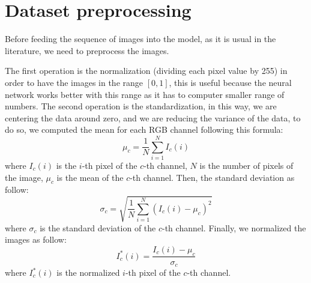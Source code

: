 \section{Dataset preprocessing}\label{sec:dataset-preprocessing}

Before feeding the sequence of images into the model, as it is usual in the literature, we need to preprocess the images.

The first operation is the normalization (dividing each pixel value by 255) in order to have the images in the range $[0,1]$, this is useful because the neural network works better with this range as it has to computer smaller range of numbers.
The second operation is the standardization, in this way, we are centering the data around zero, and we are reducing the variance of the data, to do so, we computed the mean for each RGB channel following this formula:
\begin{equation}
    \mu_{c} = \frac{1}{N}\sum_{i=1}^{N}I_{c}(i)
    \label{eq:equation_mean}
\end{equation}
where $I_{c}(i)$ is the $i$-th pixel of the $c$-th channel, $N$ is the number of pixels of the image, $\mu_{c}$ is the mean of the $c$-th channel.
Then, the standard deviation as follow:
\begin{equation}
    \sigma_{c} = \sqrt{\frac{1}{N}\sum_{i=1}^{N}(I_{c}(i) - \mu_{c})^{2}}
    \label{eq:equation_std_dev}
\end{equation}
where $\sigma_{c}$ is the standard deviation of the $c$-th channel.
Finally, we normalized the images as follow:
\begin{equation}
    I^*_{c}(i) = \frac{I_{c}(i) - \mu_{c}}{\sigma_{c}}
    \label{eq:equation_normalization}
\end{equation}
where $I^*_{c}(i)$ is the normalized $i$-th pixel of the $c$-th channel.

